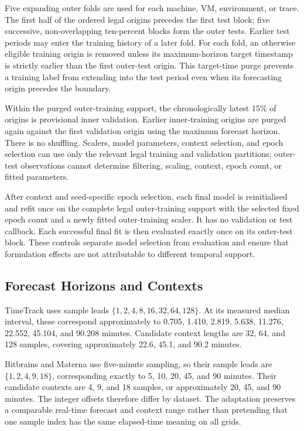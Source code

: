 \documentclass[a4paper,fleqn]{cas-dc}
\begin{document}
Five expanding outer folds are used for each machine, VM, environment, or
trace.  The first half of the ordered legal origins precedes the first test
block; five successive, non-overlapping ten-percent blocks form the outer
tests.  Earlier test periods may enter the training history of a later fold.
For each fold, an otherwise eligible training origin is removed unless its
maximum-horizon target timestamp is strictly earlier than the first outer-test
origin.  This target-time purge prevents a training label from extending into
the test period even when its forecasting origin precedes the boundary.

Within the purged outer-training support, the chronologically latest 15\% of
origins is provisional inner validation.  Earlier inner-training origins are
purged again against the first validation origin using the maximum forecast
horizon.  There is no shuffling.  Scalers, model parameters, context selection,
and epoch selection can use only the relevant legal training and validation
partitions; outer-test observations cannot determine filtering, scaling,
context, epoch count, or fitted parameters.

After context and seed-specific epoch selection, each final model is
reinitialised and refit once on the complete legal outer-training support with
the selected fixed epoch count and a newly fitted outer-training scaler.  It
has no validation or test callback.  Each successful final fit is then
evaluated exactly once on its outer-test block.  These controls separate model
selection from evaluation and ensure that formulation effects are not
attributable to different temporal support.

\subsection{Forecast Horizons and Contexts}
\label{sec:horizons-contexts}

TimeTrack uses sample leads
$\{1,2,4,8,16,32,64,128\}$.  At its measured median interval, these correspond
approximately to 0.705, 1.410, 2.819, 5.638, 11.276, 22.552, 45.104, and
90.208 minutes.  Candidate context lengths are 32, 64, and 128 samples,
covering approximately 22.6, 45.1, and 90.2 minutes.

Bitbrains and Materna use five-minute sampling, so their sample leads are
$\{1,2,4,9,18\}$, corresponding exactly to 5, 10, 20, 45, and 90 minutes.
Their candidate contexts are 4, 9, and 18 samples, or approximately 20, 45,
and 90 minutes.  The integer offsets therefore differ by dataset.  The
adaptation preserves a comparable real-time forecast and context range rather
than pretending that one sample index has the same elapsed-time meaning on all
grids.
\end{document}
